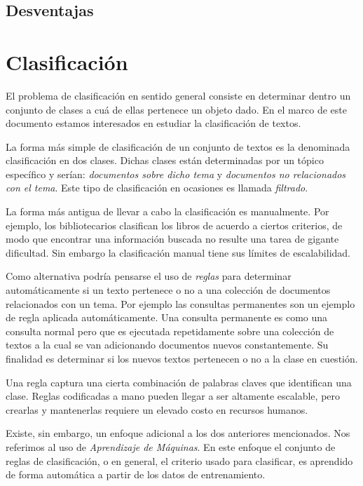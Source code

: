 \documentclass{llncs}
\begin{document}
\subsection{Desventajas} 

\section{Clasificaci\'on}

	El problema de clasificaci\'on en sentido general consiste en determinar dentro un conjunto de clases a cu\'a de ellas pertenece un objeto dado. En el marco de este documento estamos interesados en estudiar la clasificaci\'on de textos. 
	
	La forma m\'as simple de clasificaci\'on de un conjunto de textos es la denominada clasificaci\'on en dos clases. Dichas clases est\'an determinadas por un t\'opico espec\'ifico y ser\'ian: \emph{documentos sobre dicho tema } y \emph{documentos no relacionados con el tema}. Este tipo de clasificaci\'on en ocasiones es llamada \emph{filtrado}. 
	
	La forma m\'as antigua de llevar a cabo la clasificaci\'on es manualmente. Por ejemplo, los bibliotecarios clasifican los libros de acuerdo a ciertos criterios, de modo que encontrar una informaci\'on buscada no resulte una tarea de gigante dificultad. Sin embargo la clasificaci\'on manual tiene sus l\'imites de escalabilidad. 
	
	Como alternativa podr\'ia pensarse el uso de \emph{reglas} para determinar autom\'aticamente si un texto pertenece o no a una colecci\'on de documentos relacionados con un tema. Por ejemplo las consultas permanentes son un ejemplo de regla aplicada autom\'aticamente. Una consulta permanente es como una consulta normal pero que es ejecutada repetidamente sobre una colecci\'on de textos a la cual se van adicionando documentos nuevos constantemente. Su finalidad es determinar si los nuevos textos pertenecen o no a la clase en cuesti\'on.
	
	Una regla captura una cierta combinaci\'on de palabras claves que identifican una clase. Reglas codificadas a mano pueden llegar a ser altamente escalable, pero crearlas y mantenerlas requiere un elevado costo en recursos humanos.
	
	Existe, sin embargo, un enfoque adicional a los dos anteriores mencionados. Nos referimos al uso de \emph{Aprendizaje de M\'aquinas}. En este enfoque el conjunto de reglas de clasificaci\'on, o en general, el criterio usado para clasificar, es aprendido de forma autom\'atica a partir de los datos de entrenamiento.
	
\end{document}
